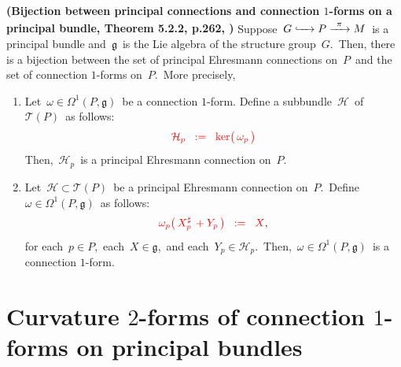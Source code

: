
\vskip 0.5cm
\begin{theorem}\textnormal{\bf(Bijection between principal connections and connection $1$-forms on a principal bundle, Theorem 5.2.2, p.262, \cite{Hamilton2017})}
\label{EhresmannConectionEquivalentToConnectionOneForm}
\mbox{}
\vskip 0.05cm
\noindent
Suppose
\,$G \xhookrightarrow{{\color{white}222}} P \xrightarrow{{\color{white}2}\pi{\color{white}2}} M$\,
is a principal bundle and
\,$\mathfrak{g}$\, is the Lie algebra of the structure group \,$G$.\,
Then, there is a bijection between the set of principal Ehresmann connections on \,$P$\,
and the set of connection $1$-forms on \,$P$.\, More precisely,
\begin{enumerate}
\item
	Let \,$\omega \in \Omega^{1}(P,\mathfrak{g})$\, be a connection $1$-form.
	Define a subbundle \,$\mathcal{H}$\, of \,$\mathcal{T}(P)$\, as follows:
	\begin{equation*}
	{\color{red}
	\mathcal{H}_{p} \;\; := \;\; \ker\!\left(\,\overset{{\color{white}.}}{\omega_{p}}\,\right)
	}
	\end{equation*}
	Then, \,$\mathcal{H}_{p}$\, is a principal Ehresmann connection on \,$P$.\,
\item
	Let \,$\mathcal{H} \subset \mathcal{T}(P)$\, be a principal Ehresmann connection on \,$P$.\,
	Define \,$\omega \in \Omega^{1}(P,\mathfrak{g})$\, as follows:
	\begin{equation*}
	{\color{red}
	\omega_{p}\!\left(\,
		X^{\sharp}_{p} \,+ Y_{p}
		\,\right)
	\;\; := \;\;
		X
	},
	\end{equation*}
	for each \,$p \in P$,\, each \,$X \in \mathfrak{g}$,\, and each \,$Y_{p} \in \mathcal{H}_{p}$.\,
	Then, \,$\omega \in \Omega^{1}(P,\mathfrak{g})$\, is a connection $1$-form.
\end{enumerate}
\end{theorem}


\vskip 0.5cm
\section{Curvature $2$-forms of connection $1$-forms on principal bundles}


